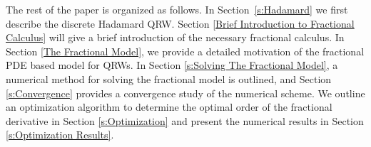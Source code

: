 \documentclass{siamart1116}
\begin{document}
The rest of the paper is organized as follows. In Section~\ref{s:Hadamard} we first describe the
discrete Hadamard QRW. Section \ref{Brief Introduction to Fractional Calculus} will give a brief introduction of the necessary fractional calculus. In Section \ref{The Fractional Model}, we provide a detailed motivation of the fractional PDE based model for QRWs. In Section \ref{s:Solving The Fractional Model}, a numerical method for solving the fractional model is outlined, and Section \ref{s:Convergence} provides a convergence study of the numerical scheme. We outline an optimization 
algorithm to determine the optimal order of the fractional derivative in Section \ref{s:Optimization} and present the numerical results in Section \ref{s:Optimization Results}. 
%
\end{document}
